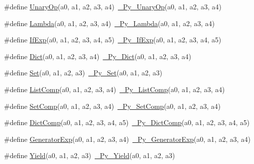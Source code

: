 \begin{DoxyCompactItemize}
\item 
\#define \mbox{\hyperlink{_python-ast_8h_a58d061c3512544360f86829dd63f4dd8}{Unary\+Op}}(a0,  a1,  a2,  a3,  a4)~\mbox{\hyperlink{_python-ast_8h_a988c2f43347c9e208c14ee54290474ec}{\+\_\+\+Py\+\_\+\+Unary\+Op}}(a0, a1, a2, a3, a4)
\item 
\#define \mbox{\hyperlink{_python-ast_8h_af3d84783a7fe3a1241ff0794313d29b9}{Lambda}}(a0,  a1,  a2,  a3,  a4)~\mbox{\hyperlink{_python-ast_8h_a445d98073909530cdb4b51f5c640baf5}{\+\_\+\+Py\+\_\+\+Lambda}}(a0, a1, a2, a3, a4)
\item 
\#define \mbox{\hyperlink{_python-ast_8h_ad3500934a5f5005efe3561ccec6e1610}{If\+Exp}}(a0,  a1,  a2,  a3,  a4,  a5)~\mbox{\hyperlink{_python-ast_8h_a912e7818e9f2abb4d541e6fb1cba269e}{\+\_\+\+Py\+\_\+\+If\+Exp}}(a0, a1, a2, a3, a4, a5)
\item 
\#define \mbox{\hyperlink{_python-ast_8h_acab9403d000db48011d6f4bf9fea8b42}{Dict}}(a0,  a1,  a2,  a3,  a4)~\mbox{\hyperlink{_python-ast_8h_a9c9d41ca778cf10d746e215dcb75c978}{\+\_\+\+Py\+\_\+\+Dict}}(a0, a1, a2, a3, a4)
\item 
\#define \mbox{\hyperlink{_python-ast_8h_a8b39bad9fda6bc73af75e4d6085bcf91}{Set}}(a0,  a1,  a2,  a3)~\mbox{\hyperlink{_python-ast_8h_adf1513b1fa378e46c866f0bb85194b5f}{\+\_\+\+Py\+\_\+\+Set}}(a0, a1, a2, a3)
\item 
\#define \mbox{\hyperlink{_python-ast_8h_a436d129c9cca91b65e07a852cd5f61da}{List\+Comp}}(a0,  a1,  a2,  a3,  a4)~\mbox{\hyperlink{_python-ast_8h_ae1343d568a74770d89054de3b27a689e}{\+\_\+\+Py\+\_\+\+List\+Comp}}(a0, a1, a2, a3, a4)
\item 
\#define \mbox{\hyperlink{_python-ast_8h_afb79ec461a79de87fb3eb00294630872}{Set\+Comp}}(a0,  a1,  a2,  a3,  a4)~\mbox{\hyperlink{_python-ast_8h_ac4460b8e0df62ceb60802eea5f299c19}{\+\_\+\+Py\+\_\+\+Set\+Comp}}(a0, a1, a2, a3, a4)
\item 
\#define \mbox{\hyperlink{_python-ast_8h_ada9dd0cacf4a2576a7f38345eb8a37e9}{Dict\+Comp}}(a0,  a1,  a2,  a3,  a4,  a5)~\mbox{\hyperlink{_python-ast_8h_a221e34772c12c38d3e2b230bf2c20471}{\+\_\+\+Py\+\_\+\+Dict\+Comp}}(a0, a1, a2, a3, a4, a5)
\item 
\#define \mbox{\hyperlink{_python-ast_8h_a1e309a988adeb91682c14a36c35bc7f5}{Generator\+Exp}}(a0,  a1,  a2,  a3,  a4)~\mbox{\hyperlink{_python-ast_8h_a2e8fb0398e6235d848e31d61b4f34289}{\+\_\+\+Py\+\_\+\+Generator\+Exp}}(a0, a1, a2, a3, a4)
\item 
\#define \mbox{\hyperlink{_python-ast_8h_ad1fd9f3236ea0923e1d29bc825cc0249}{Yield}}(a0,  a1,  a2,  a3)~\mbox{\hyperlink{_python-ast_8h_aef15cd5d48730f2c5f4215d2cfc170df}{\+\_\+\+Py\+\_\+\+Yield}}(a0, a1, a2, a3)

\end{DoxyCompactItemize}
